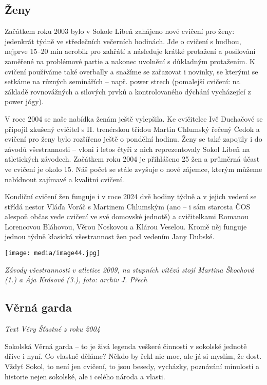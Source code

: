 \subsection{Ženy}\label{ux17eeny}

Začátkem roku 2003 bylo v Sokole Libeň zahájeno nové cvičení pro ženy:
jedenkrát týdně ve středečních večerních hodinách. Jde o cvičení s
hudbou, nejprve 15--20 min aerobik pro zahřátí a následuje krátké
protažení a posilování zaměřené na problémové partie a nakonec uvolnění
s důkladným protažením. K cvičení používáme také overbally a snažíme se
zařazovat i novinky, se kterými se setkáme na různých seminářích --
např. power strech (pomalejší cvičení: na základě rovnovážných a
silových prvků a kontrolovaného dýchání vycházející z power jógy).

V roce 2004 se naše nabídka ženám ještě vylepšila. Ke cvičitelce Ivě
Duchačové se připojil zkušený cvičitel s II. trenérskou třídou Martin
Chlumský řečený Čedok a cvičení pro ženy bylo rozšířeno ještě o pondělní
hodinu. Ženy se také zapojily i do závodů všestrannosti -- vloni i letos
čtyři z nich reprezentovaly Sokol Libeň na atletických závodech.
Začátkem roku 2004 je přihlášeno 25 žen a průměrná účast ve cvičení je
okolo 15. Náš počet se stále zvyšuje o nové zájemce, kterým můžeme
nabídnout zajímavé a kvalitní cvičení.

Kondiční cvičení žen funguje i v roce 2024 dvě hodiny týdně a v jejich
vedení se střídá nestor Vláďa Voráč s Martinem Chlumským (ano -- i sám
starosta ČOS alespoň občas vede cvičení ve své domovské jednotě) a
cvičitelkami Romanou Lorencovou Bláhovou, Věrou Noskovou a Klárou
Veselou. Kromě něj funguje jednou týdně klasická všestrannost žen pod
vedením Jany Dubské.

\texttt{[image: media/image44.jpg]}

\emph{Závody všestrannosti v atletice 2009, na stupních vítězů stojí
Martina Škochová (1.) a Ája Krásová (3.), foto: archiv J. Přech}

\subsection{Věrná garda}\label{vux11brnuxe1-garda-1}

\emph{Text Věry Šťastné z roku 2004}

Sokolská Věrná garda -- to je živá legenda veškeré činnosti v sokolské
jednotě dříve i nyní. Co vlastně děláme? Někdo by řekl nic moc, ale já
si myslím, že dost. Vždyť Sokol, to není jen cvičení, to jsou besedy,
vycházky, poznávání minulosti a historie nejen sokolské, ale i celého
národa a vlasti.

